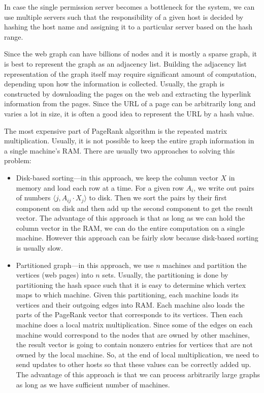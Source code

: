 In case the single permission server becomes a bottleneck for the
system, we can use multiple servers such that the responsibility of a
given host is decided by hashing the host name and assigning it to a
particular server based on the hash range.

Since the web graph can have billions of nodes and it is mostly a
sparse graph, it is best to represent the graph as an adjacency list.
Building the adjacency list representation of the graph itself may
require significant amount of computation, depending upon how the
information is collected. Usually, the graph is constructed by
downloading the pages on the web and extracting the hyperlink
information from the pages. Since the URL of a page can be arbitrarily
long and varies a lot in size, it is often a good idea to represent
the URL by a hash value.

The most expensive part of PageRank algorithm is the repeated matrix
multiplication. Usually, it is not possible to keep the entire graph
information in a single machine's RAM. There are usually two
approaches to solving this problem:
\begin{itemize}
\itemsep 1pt
\item Disk-based sorting---in this approach, we keep the column
  vector $X$ in memory and load each row at a time.  For a given row
  $A_i$, we write out pairs of numbers $\langle j, A_{ij}\cdot
  X_j\rangle$ to disk. Then we sort the pairs by their first component
  on disk and then add up the second component to get the result
  vector.  The advantage of this approach is that as long as we can
  hold the column vector in the RAM, we can do the entire computation
  on a single machine. However this approach can be fairly slow
  because disk-based sorting is usually slow.

\item Partitioned graph---in this approach, we use $n$ machines
  and partition the vertices (web pages) into $n$ sets. Usually, the
  partitioning is done by partitioning the hash space such that it is
  easy to determine which vertex maps to which machine. Given this
  partitioning, each machine loads its vertices and their outgoing
  edges into RAM. Each machine also loads the parts of the PageRank
  vector that corresponds to its vertices. Then each machine does a
  local matrix multiplication. Since some of the edges on each machine
  would correspond to the nodes that are owned by other machines, the
  result vector is going to contain nonzero entries for vertices that
  are not owned by the local machine. So, at the end of local
  multiplication, we need to send updates to other hosts so that
  these values can be correctly added up. The advantage of this
  approach is that we can process arbitrarily large graphs as long as
  we have sufficient number of machines. 
\end{itemize}

